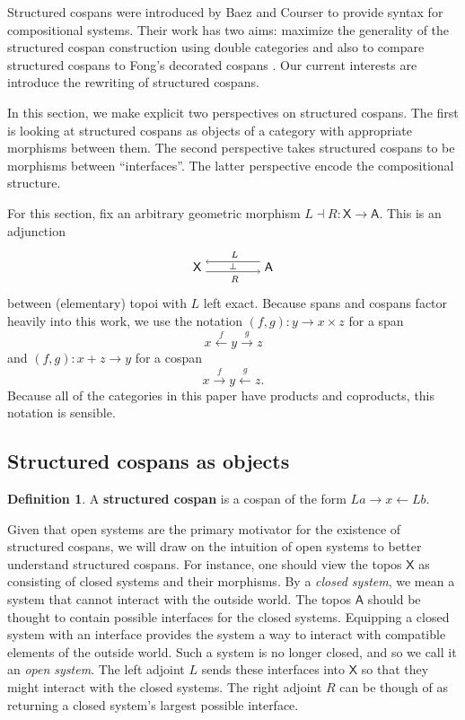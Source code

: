 \documentclass{amsart}
\newcommand{\A}{\cat{A}}
\newcommand{\X}{\cat{X}}
\newcommand{\defn}[1]{\textbf{#1}}
\newcommand{\cat}[1]{\mathsf{#1}}
\newcommand{\from}{\colon}
\newcommand{\xto}[1]{\xrightarrow{#1}}
\renewcommand{\gets}{\leftarrow}
\newcommand{\xgets}[1]{\xleftarrow{#1}}
\newcommand{\spn}[3]{#2 \to #1 \times #3}
\newcommand{\csp}[3]{#1 + #3 \to #2}
\theoremstyle{remark}
\theoremstyle{definition}
\newtheorem{definition}[theorem]{Definition}
\newcommand{\adjunction}[4]{%
  \begin{tikzpicture}[baseline=-3pt]
    \node (1) at (0,0) {\( #1 \)};
    \node (2) at (2,0) {\( #4 \)};
    \draw [->]
    ([yshift= 4pt]2.west) to
    node [above] {\scriptsize{ $ #2 $ }}
    ([yshift= 4pt]1.east);
    \draw [->]
    ([yshift= -4pt]1.east) to
    node [below] {\scriptsize{ $ #3 $ }}
    node [above,yshift= -1.5pt] {\scriptsize{$ \perp $}}
    ([yshift= -4pt]2.west);
  \end{tikzpicture}
}
\begin{document}
Structured cospans were introduced by Baez and Courser
\cite{StrCsp} to provide syntax for compositional
systems. Their work has two aims: maximize the generality
of the structured cospan construction using double categories and also
to compare structured cospans to Fong's decorated cospans
\cite{DecorCsp}. Our current interests are introduce the
rewriting of structured cospans. 

In this section, we make explicit two perspectives on structured
cospans.  The first is looking at structured cospans as objects of a
category with appropriate morphisms between them. The second
perspective takes structured cospans to be morphisms between
``interfaces''.  The latter perspective encode the compositional
structure.

For this section, fix an arbitrary geometric morphism
$ L \dashv R \from \X \to \A $. This is an adjunction
%
\[
  \adjunction{\X}{L}{R}{\A}
\]
%
between (elementary) topoi with $ L $ left exact. Because spans and
cospans factor heavily into this work, we use the notation
%
\(
 (f,g) \from \spn{x}{y}{z}
\)
% 
for a span
%
\[
  x \xgets{f} y \xto{g} z
\]
%
and
%
\(
  (f,g) \from \csp{x}{y}{z}
\)
% 
for a cospan
%
\[
  x \xto{f} y \xgets{g} z.
\]
% 
Because all of the categories in this paper have products and
coproducts, this notation is sensible.


\subsection{Structured cospans as objects}
\label{sec:StrCspAsObject}

\begin{definition}\label{df:strcsp}
  A \defn{ structured cospan } is a cospan of the form
  $ La \to x \gets Lb $. 
\end{definition}

Given that open systems are the primary motivator for the existence of
structured cospans, we will draw on the intuition of open systems to
better understand structured cospans.  For instance, one should view
the topos $ \X $ as consisting of closed systems and their
morphisms. By a \emph{closed system}, we mean a system that cannot
interact with the outside world. The topos $ \A $ should be thought to
contain possible interfaces for the closed systems. Equipping a closed
system with an interface provides the system a way to interact with
compatible elements of the outside world. Such a system is no longer
closed, and so we call it an \emph{open system}. The left adjoint
$ L $ sends these interfaces into $ \X $ so that they might interact
with the closed systems. The right adjoint $ R $ can be though of as
returning a closed system's largest possible interface. 
\end{document}
